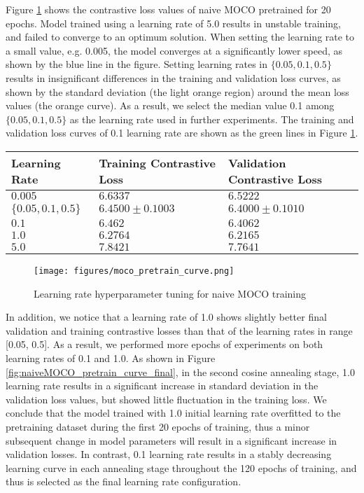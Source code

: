 \documentclass[12pt,twoside]{report}
\begin{document}
Figure \ref{fig:naiveMOCO_pretrain_curve} shows the contrastive loss values of naive MOCO pretrained for 20 epochs. Model trained using a learning rate of 5.0 results in unstable training, and failed to converge to an optimum solution. When setting the learning rate to a small value, e.g. 0.005, the model converges at a significantly lower speed, as shown by the blue line in the figure. Setting learning rates in $\{0.05, 0.1, 0.5\}$ results in insignificant differences in the training and validation loss curves, as shown by the standard deviation (the light orange region) around the mean loss values (the orange curve). As a result, we select the median value 0.1 among $\{0.05, 0.1, 0.5\}$ as the learning rate used in further experiments. The training and validation loss curves of 0.1 learning rate are shown as the green lines in Figure \ref{fig:naiveMOCO_pretrain_curve}. \\

\begin{table}[]
    \centering
    \begin{tabular}{lll}
    \toprule
    Learning Rate & Training Contrastive Loss & Validation Contrastive Loss \\
    \midrule
    $0.005$ & $6.6337$ & $6.5222$ \\
    $\{0.05, 0.1, 0.5 \}$ & $6.4500 \pm 0.1003$ & $6.4000 \pm 0.1010 $ \\
    $0.1$ & $6.462$ & $6.4062$ \\
    $1.0$ & $6.2764$ & $6.2165$ \\
    $5.0$ & $7.8421$ & $7.7641$ \\
    \bottomrule
    \end{tabular}
    \captionsetup{type=table}
    \label{tab:naive_moco_tuning}
\end{table}

\begin{figure}
    \centering
    \texttt{[image: figures/moco\_pretrain\_curve.png]}
    \caption{Learning rate hyperparameter tuning for naive MOCO training}
    \label{fig:naiveMOCO_pretrain_curve}
\end{figure}

In addition, we notice that a learning rate of 1.0 shows slightly better final validation and training contrastive losses than that of the learning rates in range [0.05, 0.5]. As a result, we performed more epochs of experiments on both learning rates of 0.1 and 1.0. As shown in Figure \ref{fig:naiveMOCO_pretrain_curve_final}, in the second cosine annealing stage, 1.0 learning rate results in a significant increase in standard deviation in the validation loss values, but showed little fluctuation in the training loss. We conclude that the model trained with 1.0 initial learning rate overfitted to the pretraining dataset during the first 20 epochs of training, thus a minor subsequent change in model parameters will result in a significant increase in validation losses. In contrast, 0.1 learning rate results in a stably decreasing learning curve in each annealing stage throughout the 120 epochs of training, and thus is selected as the final learning rate configuration. \\
\end{document}
